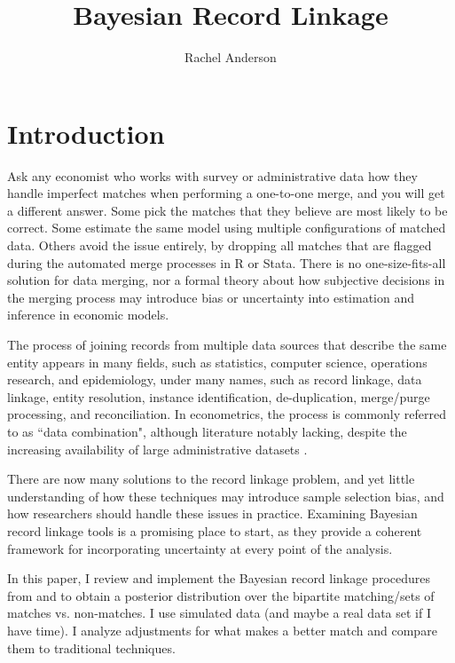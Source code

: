 \documentclass[11pt,reqno]{amsart}
\title{Bayesian Record Linkage}
\author{Rachel Anderson}
\begin{document}
\vspace*{-1cm}
\maketitle


\section{Introduction}

Ask any economist who works with survey or administrative data how they handle imperfect matches when performing a one-to-one merge, and you will get a different answer.  Some pick the matches that they believe are most likely to be correct.  Some estimate the same model using multiple configurations of matched data.  Others avoid the issue entirely, by dropping all matches that are flagged during the automated merge processes in R or Stata.  There is no one-size-fits-all solution for data merging, nor a formal theory about how subjective decisions in the merging process may introduce bias or uncertainty into estimation and inference in economic models. 

The process of joining records from multiple data sources that describe the same entity appears in many fields, such as statistics, computer science, operations research, and epidemiology, under many names, such as record linkage, data linkage, entity resolution, instance identification, de-duplication, merge/purge processing, and reconciliation.    In econometrics, the process is commonly referred to as ``data combination", although literature notably lacking, despite the increasing availability of large administrative datasets \citep{ridder_moffitt_2007}.

There are now many solutions to the record linkage problem, and yet little understanding of how these techniques may introduce sample selection bias, and how researchers should handle these issues in practice.  Examining Bayesian record linkage tools is a promising place to start, as they provide a coherent framework for incorporating uncertainty at every point of the analysis.  

In this paper, I review and implement the Bayesian record linkage procedures from \cite{larsen_rubin_2001} and \cite{sadinle_2017} to obtain a posterior distribution over the bipartite matching/sets of matches vs. non-matches. I use simulated data (and maybe a real data set if I have time).  I analyze adjustments for what makes a better match and compare them to traditional techniques.
\end{document}
